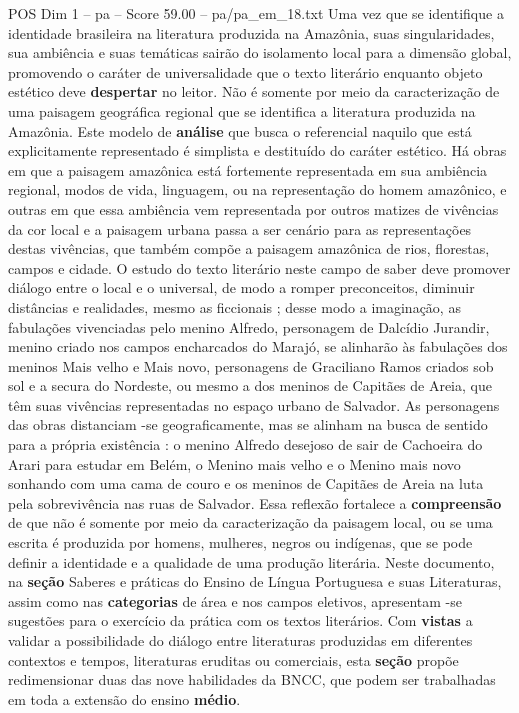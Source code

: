 \begin{textsample}{POS Dim 1 – pa – Score 59.00 – pa/pa\_em\_18.txt}
Uma vez que se identifique a identidade brasileira na literatura produzida na Amazônia, suas singularidades, sua ambiência e suas temáticas sairão do isolamento local para a dimensão global, promovendo o caráter de universalidade que o texto literário enquanto objeto estético deve \textbf{despertar} no leitor.
Não é somente por meio da caracterização de uma paisagem geográfica regional que se identifica a literatura produzida na Amazônia.
Este modelo de \textbf{análise} que busca o referencial naquilo que está explicitamente representado é simplista e destituído do caráter estético.
Há obras em que a paisagem amazônica está fortemente representada em sua ambiência regional, modos de vida, linguagem, ou na representação do homem amazônico, e outras em que essa ambiência vem representada por outros matizes de vivências da cor local e a paisagem urbana passa a ser cenário para as representações destas vivências, que também compõe a paisagem amazônica de rios, florestas, campos e cidade.
O estudo do texto literário neste campo de saber deve promover diálogo entre o local e o universal, de modo a romper preconceitos, diminuir distâncias e realidades, mesmo as ficcionais ; desse modo a imaginação, as fabulações vivenciadas pelo menino Alfredo, personagem de Dalcídio Jurandir, menino criado nos campos encharcados do Marajó, se alinharão às fabulações dos meninos Mais velho e Mais novo, personagens de Graciliano Ramos criados sob sol e a secura do Nordeste, ou mesmo a dos meninos de Capitães de Areia, que têm suas vivências representadas no espaço urbano de Salvador.
As personagens das obras distanciam -se geograficamente, mas se alinham na busca de sentido para a própria existência : o menino Alfredo desejoso de sair de Cachoeira do Arari para estudar em Belém, o Menino mais velho e o Menino mais novo sonhando com uma cama de couro e os meninos de Capitães de Areia na luta pela sobrevivência nas ruas de Salvador.
Essa reflexão fortalece a \textbf{compreensão} de que não é somente por meio da caracterização da paisagem local, ou se uma escrita é produzida por homens, mulheres, negros ou indígenas, que se pode definir a identidade e a qualidade de uma produção literária.
Neste documento, na \textbf{seção} Saberes e práticas do Ensino de Língua Portuguesa e suas Literaturas, assim como nas \textbf{categorias} de área e nos campos eletivos, apresentam -se sugestões para o exercício da prática com os textos literários.
Com \textbf{vistas} a validar a possibilidade do diálogo entre literaturas produzidas em diferentes contextos e tempos, literaturas eruditas ou comerciais, esta \textbf{seção} propõe redimensionar duas das nove habilidades da BNCC, que podem ser trabalhadas em toda a extensão do ensino \textbf{médio}.

\end{textsample}
